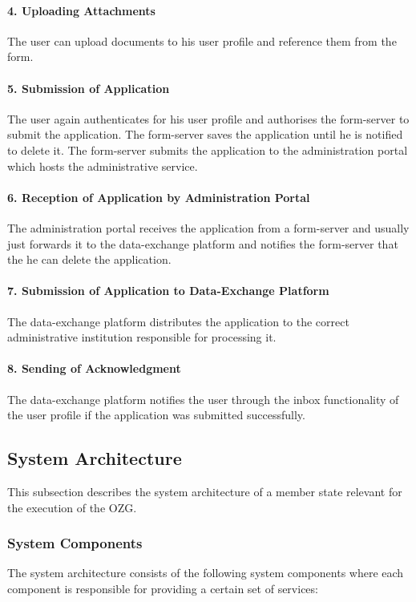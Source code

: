 \documentclass[
     12pt,         %
     a4paper,      %
     BCOR=10mm,version=first,     %
     DIV=14,version=first,        %
     ]{scrreprt}
\begin{document}
\paragraph{4. Uploading Attachments}
The user can upload documents to his user profile and reference them from the form.

\paragraph{5. Submission of Application}
The user again authenticates for his user profile and authorises the form-server to submit the application. The form-server saves the application until he is notified to delete it. The form-server submits the application to the administration portal which hosts the administrative service.

\paragraph{6. Reception of Application by Administration Portal}
The administration portal receives the application from a form-server and usually just forwards it to the data-exchange platform and notifies the form-server that the he can delete the application.

\paragraph{7. Submission of Application to Data-Exchange Platform}
The data-exchange platform distributes the application to the correct administrative institution responsible for processing it.

\paragraph{8. Sending of Acknowledgment}
The data-exchange platform notifies the user through the inbox functionality of the user profile if the application was submitted successfully.

\subsection{System Architecture}
This subsection describes the system architecture of a member state relevant for the execution of the OZG.

\subsubsection{System Components}
The system architecture consists of the following system components where each component is responsible for providing a certain set of services:
\end{document}
